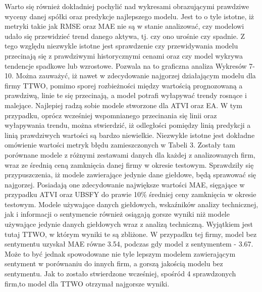 \documentclass[11pt]{article} %
\begin{document}
Warto się również dokładniej pochylić nad wykresami obrazującymi prawdziwe wyceny danej spółki oraz predykcje najlepszego modelu. Jest to o tyle istotne, iż metryki takie jak RMSE oraz MAE nie są w stanie analizować, czy modelowi udało się przewidzieć trend danego aktywa, tj. czy ono urośnie czy spadnie. Z tego względu niezwykle istotne jest sprawdzenie czy przewidywania modelu przecinają się z prawdziwymi historycznymi cenami oraz czy model wykrywa tendencje spadkowe lub wzrostowe. Pozwala na to graficzna analiza Wykresów 7-10. Można zauważyć, iż nawet w zdecydowanie najgorzej działającym modelu dla firmy TTWO, pomimo sporej rozbieżności między wartością prognozowaną a prawdziwą, linie te się przecinają, a model potrafi wyłapywać trendy rosnące i malejące. Najlepiej radzą sobie modele stworzone dla ATVI oraz EA. W tym przypadku, oprócz wcześniej wspomnianego przecinania się linii oraz wyłapywania trendu, można stwierdzić, iż odległości pomiędzy linią predykcji a linią prawdziwych wartości są bardzo niewielkie. 
Niezwykle istotne jest dokładne omówienie wartości metryk błędu zamieszczonych  w Tabeli 3. Zostały tam porównane modele z różnymi zestawami danych dla każdej z analizowanych firm, wraz ze średnią ceną zamknięcia danej firmy w okresie testowym. Sprawdziły się przypuszczenia, iż modele zawierające jedynie dane giełdowe, będą sprawować się najgorzej. Posiadają one zdecydowanie największe wartości MAE, sięgające w przypadku ATVI oraz UBSFY do prawie 10\% średniej ceny zamknięcia w okresie testowym. Modele używające danych giełdowych, wskaźników analizy technicznej, jak i informacji o sentymencie również osiągają gorsze wyniki niż modele używające jedynie danych giełdowych wraz z analizą techniczną. Wyjątkiem jest tutaj TTWO, w którym wyniki te są zbliżone. W przypadku tej firmy, model bez sentymentu uzyskał MAE równe 3.54, podczas gdy model z sentymentem - 3.67. Może to być jednak spowodowane nie tyle lepszym modelem zawierającym sentyment w porównaniu do innych firm, a gorszą jakością modelu bez sentymentu. Jak to zostało stwierdzone wcześniej, spośród 4 sprawdzonych firm,to model dla TTWO otrzymał najgorsze wyniki.
\end{document}
